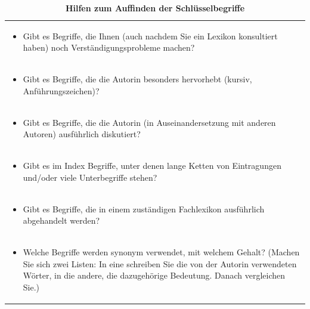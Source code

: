\documentclass[]{book}
\providecommand{\tightlist}{%
  \setlength{\itemsep}{0pt}\setlength{\parskip}{0pt}}
\theoremstyle{definition}
\theoremstyle{definition}
\theoremstyle{definition}
\theoremstyle{remark}
\begin{document}
\begin{longtable}[]{@{}l@{}}
\caption{\textbf{\label{tab:schluesselbegriffe} Hilfen zum Auffinden der
Schlüsselbegriffe}}\tabularnewline
\toprule
\begin{minipage}[t]{0.97\columnwidth}\raggedright\strut
\begin{itemize}
\tightlist
\item
  Gibt es Begriffe, die Ihnen (auch nachdem Sie ein Lexikon konsultiert
  haben) noch Verständigungsprobleme machen? \vspace{-6mm}
\end{itemize}\strut
\end{minipage}\tabularnewline
\begin{minipage}[t]{0.97\columnwidth}\raggedright\strut
\begin{itemize}
\tightlist
\item
  Gibt es Begriffe, die die Autorin besonders hervorhebt (kursiv,
  Anführungszeichen)? \vspace{-6mm}
\end{itemize}\strut
\end{minipage}\tabularnewline
\begin{minipage}[t]{0.97\columnwidth}\raggedright\strut
\begin{itemize}
\tightlist
\item
  Gibt es Begriffe, die die Autorin (in Auseinandersetzung mit anderen
  Autoren) ausführlich diskutiert? \vspace{-6mm}
\end{itemize}\strut
\end{minipage}\tabularnewline
\begin{minipage}[t]{0.97\columnwidth}\raggedright\strut
\begin{itemize}
\tightlist
\item
  Gibt es im Index Begriffe, unter denen lange Ketten von Eintragungen
  und/oder viele Unterbegriffe stehen? \vspace{-6mm}
\end{itemize}\strut
\end{minipage}\tabularnewline
\begin{minipage}[t]{0.97\columnwidth}\raggedright\strut
\begin{itemize}
\tightlist
\item
  Gibt es Begriffe, die in einem zuständigen Fachlexikon ausführlich
  abgehandelt werden? \vspace{-6mm}
\end{itemize}\strut
\end{minipage}\tabularnewline
\begin{minipage}[t]{0.97\columnwidth}\raggedright\strut
\begin{itemize}
\tightlist
\item
  Welche Begriffe werden synonym verwendet, mit welchem Gehalt? (Machen
  Sie sich zwei Listen: In eine schreiben Sie die von der Autorin
  verwendeten Wörter, in die andere, die dazugehörige Bedeutung. Danach
  vergleichen Sie.)
\end{itemize}\strut
\end{minipage}\tabularnewline
\bottomrule
\end{longtable}
\end{document}
